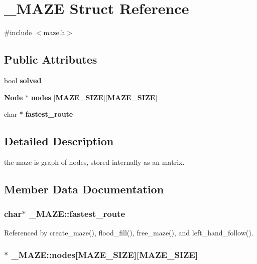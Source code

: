 \section{\-\_\-\-M\-A\-Z\-E Struct Reference}
\label{struct__MAZE}


{\ttfamily \#include $<$maze.\-h$>$}

\subsection*{Public Attributes}
\begin{DoxyCompactItemize}
\item 
bool {\bf solved}
\item 
{\bf Node} $\ast$ {\bf nodes} [{\bf M\-A\-Z\-E\-\_\-\-S\-I\-Z\-E}][{\bf M\-A\-Z\-E\-\_\-\-S\-I\-Z\-E}]
\item 
char $\ast$ {\bf fastest\-\_\-route}
\end{DoxyCompactItemize}


\subsection{Detailed Description}
the maze is graph of nodes, stored internally as an matrix. 

\subsection{Member Data Documentation}
\subsubsection[{fastest\-\_\-route}]{\setlength{\rightskip}{0pt plus 5cm}char$\ast$ \-\_\-\-M\-A\-Z\-E\-::fastest\-\_\-route}\label{struct__MAZE_a7b9247d555d606e8588851f62f6c7de8}


Referenced by create\-\_\-maze(), flood\-\_\-fill(), free\-\_\-maze(), and left\-\_\-hand\-\_\-follow().

\subsubsection[{nodes}]{$\ast$ \-\_\-\-M\-A\-Z\-E\-::nodes[{\bf M\-A\-Z\-E\-\_\-\-S\-I\-Z\-E}][{\bf M\-A\-Z\-E\-\_\-\-S\-I\-Z\-E}]}\label{struct__MAZE_a3c6979d722b6efaed52dd25f0f39ecd4}


